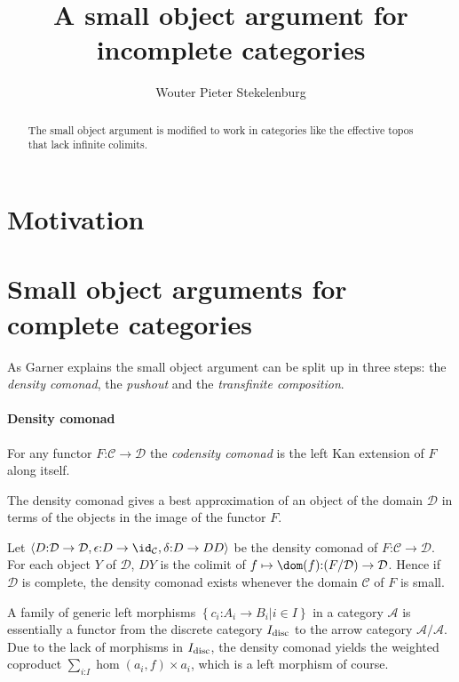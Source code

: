 \documentclass{tac}
\title{A small object argument for incomplete categories}
\author{Wouter Pieter Stekelenburg}
\newcommand\keyword[1]{\emph{#1}\label{#1}}
\newcommand\cat\mathcal
\newcommand\of{\mathord:}
\newcommand\set[1]{\left\{#1\right\}}
\newcommand\tuplet[1]{\left\langle #1 \right\rangle}
\newcommand\disc{_{\rm disc}}
\begin{document}
\begin{abstract}
The small object argument %
is modified to work in categories like the effective topos %
that lack infinite colimits.
\end{abstract}

\maketitle

\section{Motivation}

\section{Small object arguments for complete categories}
As Garner explains %
the small object argument can be split up in three steps: the \emph{density comonad}, the \emph{pushout} and the \emph{transfinite composition}.

\paragraph{Density comonad}
\begin{definition}
For any functor $F\of \cat C\to \cat D$ the \keyword{codensity comonad} 
is the left Kan extension of $F$ along itself.
\end{definition}

The density comonad gives a best approximation of an object of the domain $\cat D$ in terms of the objects in the image of the functor $F$.
 
\begin{lemma} Let $\tuplet{D\of\cat D\to\cat D,\epsilon\of D\to \id_{
\cat C},\delta\of D \to DD}$ be the density comonad of $F\of\cat C\to\cat D$. For each object $Y$ of $\cat D$, $DY$ is the colimit of $f\mapsto\dom(f)\of (F/\cat D)\to \cat D$. Hence if $\cat D$ is complete, the density comonad exists whenever the domain $\cat C$ of $F$ is small.
\end{lemma}

A family of generic left morphisms $\set{c_i\of A_i\to B_i|i\in I}$ in a category $\cat A$ is essentially a functor from the discrete category $I\disc$ to the arrow category $\cat A/\cat A$. Due to the lack of morphisms in $I\disc$, the density comonad yields the weighted coproduct $\sum_{i\of I} \hom(a_i,f)\times a_i$, which is a left morphism of course.
\end{document}
